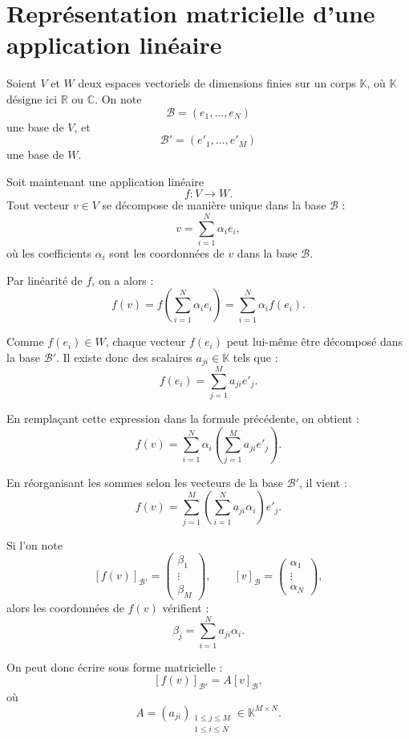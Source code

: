 \chapter{Représentation matricielle d'une application linéaire}
\label{app:representation-lineaire-matrice}

Soient $V$ et $W$ deux espaces vectoriels de dimensions finies sur un corps
$\mathbb{K}$, où $\mathbb{K}$ désigne ici $\mathbb{R}$ ou $\mathbb{C}$.
On note
\[
\mathcal{B} = (e_1,\dots,e_N)
\]
une base de $V$, et
\[
\mathcal{B}' = (e'_1,\dots,e'_M)
\]
une base de $W$.

Soit maintenant une application linéaire
\[
f : V \rightarrow W.
\]
Tout vecteur $v \in V$ se décompose de manière unique dans la base $\mathcal{B}$ :
\[
v = \sum_{i=1}^{N} \alpha_i e_i,
\]
où les coefficients $\alpha_i$ sont les coordonnées de $v$ dans la base $\mathcal{B}$.

Par linéarité de $f$, on a alors :
\[
f(v)
=
f\left(\sum_{i=1}^{N} \alpha_i e_i\right)
=
\sum_{i=1}^{N} \alpha_i f(e_i).
\]

Comme $f(e_i) \in W$, chaque vecteur $f(e_i)$ peut lui-même être décomposé dans la base
$\mathcal{B}'$. Il existe donc des scalaires $a_{j i} \in \mathbb{K}$ tels que :
\[
f(e_i)
=
\sum_{j=1}^{M} a_{j i} e'_j.
\]

En remplaçant cette expression dans la formule précédente, on obtient :
\[
f(v)
=
\sum_{i=1}^{N} \alpha_i
\left(
\sum_{j=1}^{M} a_{j i} e'_j
\right).
\]

En réorganisant les sommes selon les vecteurs de la base $\mathcal{B}'$, il vient :
\[
f(v)
=
\sum_{j=1}^{M}
\left(
\sum_{i=1}^{N} a_{j i}\alpha_i
\right)
e'_j.
\]

Si l'on note
\[
[f(v)]_{\mathcal{B}'}
=
\begin{pmatrix}
\beta_1 \\
\vdots \\
\beta_M
\end{pmatrix},
\qquad
[v]_{\mathcal{B}}
=
\begin{pmatrix}
\alpha_1 \\
\vdots \\
\alpha_N
\end{pmatrix},
\]
alors les coordonnées de $f(v)$ vérifient :
\[
\beta_j
=
\sum_{i=1}^{N} a_{j i}\alpha_i.
\]

On peut donc écrire sous forme matricielle :
\[
[f(v)]_{\mathcal{B}'}
=
A [v]_{\mathcal{B}},
\]
où
\[
A =
(a_{j i})_{\substack{1 \leq j \leq M \\ 1 \leq i \leq N}}
\in \mathbb{K}^{M \times N}.
\]

